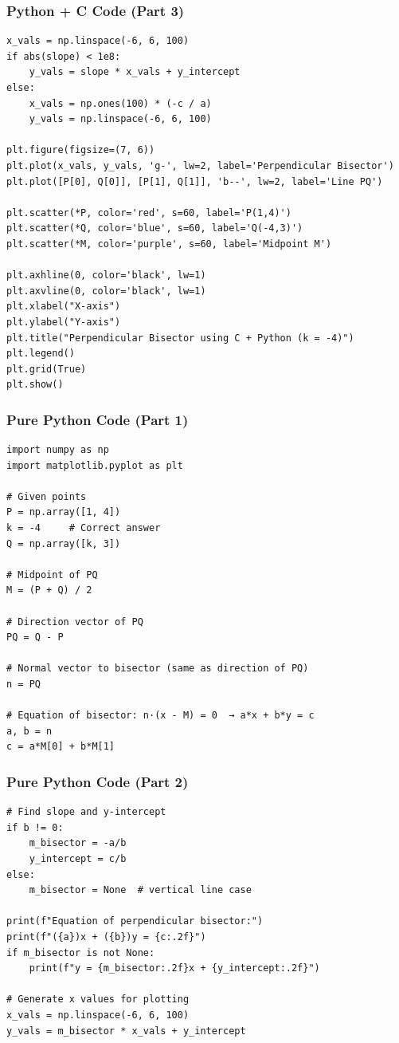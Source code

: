 \documentclass{beamer}
\begin{document}
\begin{frame}[fragile]
\frametitle{Python + C Code (Part 3)}
\begin{lstlisting}
x_vals = np.linspace(-6, 6, 100)
if abs(slope) < 1e8:
    y_vals = slope * x_vals + y_intercept
else:
    x_vals = np.ones(100) * (-c / a)
    y_vals = np.linspace(-6, 6, 100)

plt.figure(figsize=(7, 6))
plt.plot(x_vals, y_vals, 'g-', lw=2, label='Perpendicular Bisector')
plt.plot([P[0], Q[0]], [P[1], Q[1]], 'b--', lw=2, label='Line PQ')

plt.scatter(*P, color='red', s=60, label='P(1,4)')
plt.scatter(*Q, color='blue', s=60, label='Q(-4,3)')
plt.scatter(*M, color='purple', s=60, label='Midpoint M')

plt.axhline(0, color='black', lw=1)
plt.axvline(0, color='black', lw=1)
plt.xlabel("X-axis")
plt.ylabel("Y-axis")
plt.title("Perpendicular Bisector using C + Python (k = -4)")
plt.legend()
plt.grid(True)
plt.show()
\end{lstlisting}
\end{frame}
\begin{frame}[fragile]
\frametitle{Pure Python Code (Part 1)}
\begin{lstlisting}
import numpy as np
import matplotlib.pyplot as plt

# Given points
P = np.array([1, 4])
k = -4     # Correct answer
Q = np.array([k, 3])

# Midpoint of PQ
M = (P + Q) / 2

# Direction vector of PQ
PQ = Q - P

# Normal vector to bisector (same as direction of PQ)
n = PQ

# Equation of bisector: n·(x - M) = 0  → a*x + b*y = c
a, b = n
c = a*M[0] + b*M[1]
\end{lstlisting}
\end{frame}

\begin{frame}[fragile]
\frametitle{Pure Python Code (Part 2)}
\begin{lstlisting}
# Find slope and y-intercept
if b != 0:
    m_bisector = -a/b
    y_intercept = c/b
else:
    m_bisector = None  # vertical line case

print(f"Equation of perpendicular bisector:")
print(f"({a})x + ({b})y = {c:.2f}")
if m_bisector is not None:
    print(f"y = {m_bisector:.2f}x + {y_intercept:.2f}")

# Generate x values for plotting
x_vals = np.linspace(-6, 6, 100)
y_vals = m_bisector * x_vals + y_intercept
\end{lstlisting}
\end{frame}
\end{document}
